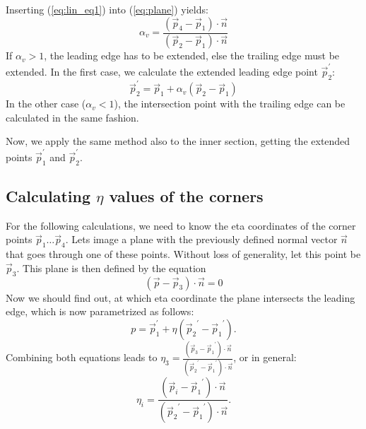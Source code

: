 Inserting (\ref{eq:lin_eq1}) into (\ref{eq:plane}) yields:
\begin{equation}
\alpha_v = \frac {(\vec p_4 - \vec p_1) \cdot \vec n }{(\vec p_2 - \vec p_1) \cdot \vec n}
\label{eq:nothing}
\end{equation}
%
If $\alpha_v > 1$, the leading edge has to be extended, else the trailing edge must be extended. In the first case, we calculate the extended leading edge point $\vec p_2^\prime$:
\begin{equation}
\vec p_2^\prime = \vec p_1 + \alpha_v (\vec p_2 - \vec p_1)
\label{eq:}
\end{equation}
%
In the other case ($\alpha_v < 1$), the intersection point with the trailing edge can be calculated in the same fashion.  \par
Now, we apply the same method also to the inner section, getting the extended points $\vec p_1^\prime$ and $\vec p_2^\prime$.

\subsection{Calculating $\eta$ values of the corners}
For the following calculations, we need to know the eta coordinates of the corner points $\vec p_1 \dots \vec p_4$. Lets image a plane with the previously defined normal vector $\vec n$ that goes through one of these points. Without loss of generality, let this point be $\vec p_3$. This plane is then defined by the equation
%
\begin{equation}
(\vec p - \vec p_3) \cdot \vec n = 0
\label{eq:plane_p3}
\end{equation}
%
Now we should find out, at which eta coordinate the plane intersects the leading edge, which is now parametrized as follows:
\begin{equation}
p = \vec p_1^ \prime + \eta ({\vec p_2}^\prime - {\vec p_1}^\prime).
\end{equation}
Combining both equations leads to $\eta_3 = \frac {(\vec p_3 - {\vec p_1}^\prime) \cdot \vec n }{({\vec p_2}^\prime - {\vec p_1}^\prime) \cdot \vec n}$, or in general:
\begin{equation}
\eta_i = \frac {(\vec p_i - {\vec p_1}^\prime) \cdot \vec n }{({\vec p_2}^\prime - {\vec p_1}^\prime)\cdot \vec n}.
\end{equation}

